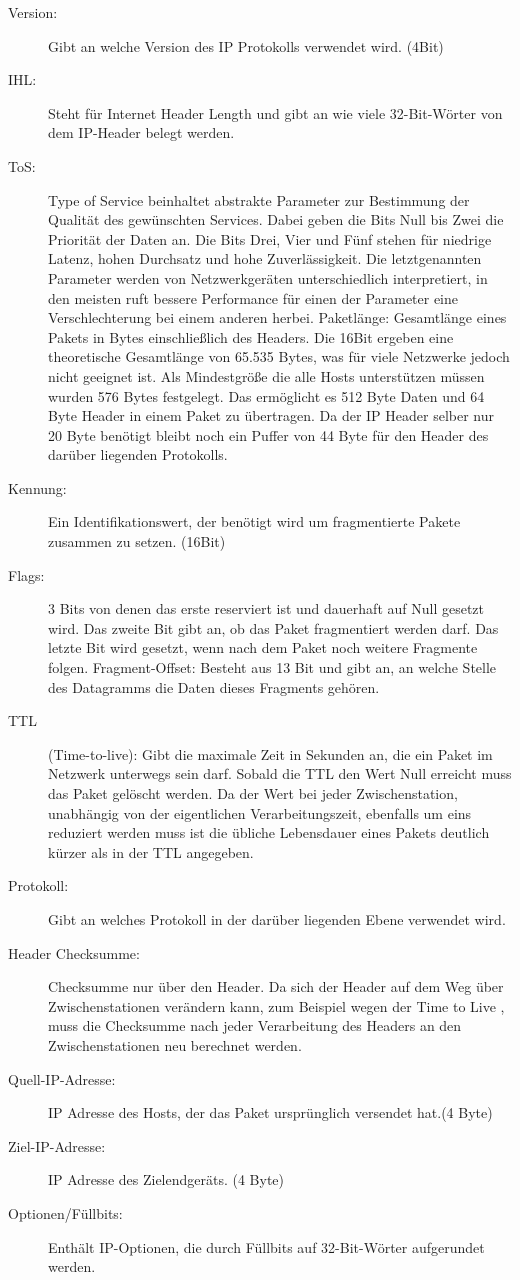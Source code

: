 \begin{description}
\item[Version: ]Gibt an welche Version des IP Protokolls verwendet wird. (4Bit)
\item[IHL: ]Steht für Internet Header Length und gibt an wie viele 32-Bit-Wörter von dem IP-Header belegt werden.
\item[ToS: ]Type of Service beinhaltet abstrakte Parameter zur Bestimmung der Qualität des gewünschten Services. Dabei geben die Bits Null bis Zwei die Priorität der Daten an. Die Bits Drei, Vier und Fünf stehen für niedrige Latenz, hohen Durchsatz und hohe Zuverlässigkeit. Die letztgenannten Parameter werden von Netzwerkgeräten unterschiedlich interpretiert, in den meisten ruft bessere Performance für einen der Parameter eine Verschlechterung bei einem anderen herbei.
Paketlänge: Gesamtlänge eines Pakets in Bytes einschließlich des Headers. Die 16Bit ergeben eine theoretische Gesamtlänge von 65.535 Bytes, was für viele Netzwerke jedoch nicht geeignet ist. Als Mindestgröße die alle Hosts unterstützen müssen wurden 576 Bytes festgelegt. Das ermöglicht es 512 Byte Daten und 64 Byte Header in einem Paket zu übertragen. Da der IP Header selber nur 20 Byte benötigt bleibt noch ein Puffer von 44 Byte für den Header des darüber liegenden Protokolls.  
\item[Kennung: ]Ein Identifikationswert, der benötigt wird um fragmentierte Pakete zusammen zu setzen.  (16Bit) 
\item[Flags: ]3 Bits von denen das erste reserviert ist und dauerhaft auf Null gesetzt wird. Das zweite Bit gibt an, ob das Paket fragmentiert werden darf. Das letzte Bit wird gesetzt, wenn nach dem Paket noch weitere Fragmente folgen.
Fragment-Offset: Besteht aus 13 Bit und gibt an, an welche Stelle des Datagramms die Daten dieses Fragments gehören. 
\item[TTL ](Time-to-live): Gibt die maximale Zeit in Sekunden an, die ein Paket im Netzwerk unterwegs sein darf. Sobald die TTL den Wert Null erreicht muss das Paket gelöscht werden. Da der Wert bei jeder Zwischenstation, unabhängig von der eigentlichen Verarbeitungszeit, ebenfalls um eins reduziert werden muss ist die übliche Lebensdauer eines Pakets deutlich kürzer als in der TTL angegeben. 
\item[Protokoll: ]Gibt an welches Protokoll in der darüber liegenden Ebene verwendet wird.
\item[Header Checksumme: ]Checksumme nur über den Header. Da sich der Header auf dem Weg über Zwischenstationen verändern kann, zum Beispiel wegen der Time to Live , muss die Checksumme nach jeder Verarbeitung des Headers an den Zwischenstationen neu berechnet werden.
\item[Quell-IP-Adresse: ]IP Adresse des Hosts, der das Paket ursprünglich versendet hat.(4 Byte)
\item[Ziel-IP-Adresse: ]IP Adresse des Zielendgeräts. (4 Byte)
\item[Optionen/Füllbits: ] Enthält IP-Optionen, die durch Füllbits auf 32-Bit-Wörter aufgerundet werden.
\end{description}

